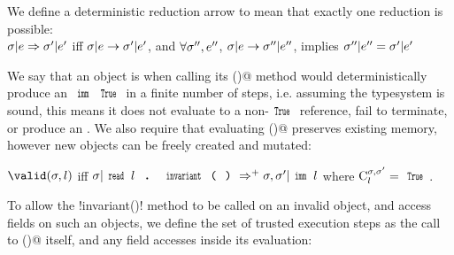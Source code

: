 %
%
We define a deterministic reduction arrow to mean that exactly one reduction is possible:\\
\indent $\sigma|e \Rightarrow \sigma'|e'$ iff $\sigma|e \rightarrow \sigma'|e'$, and $\forall \sigma'', e''$, $\sigma|e \rightarrow \sigma''|e''$, implies $\sigma''|e'' = \sigma'|e'$\\

\LS

\noindent We say that an object is \valid when calling its \Q@invariant()@ method would
deterministically produce an $\Kw{imm}\,\Kw{True}$ in a finite number of steps, i.e. assuming the typesystem is sound, this means it does not evaluate to a non-$\Kw{True}$ reference, fail to terminate, or produce an \error.
We also require that evaluating \Q@invariant()@ preserves existing memory, however new objects can be freely created and mutated:

\indent$\valid(\s,l)$ iff $\s | \invariant{l} \Rightarrow^+ \s,\s' | \Kw{imm}\,l$ where  $\C[\s,\s']{l} = \Kw{True}$.%

\noindent
To allow the \Q!invariant()! method to be called on an invalid object, and access fields on such an objects, we define the set of trusted execution steps as the call to \Q@invariant()@ itself, and any field accesses inside its evaluation:

